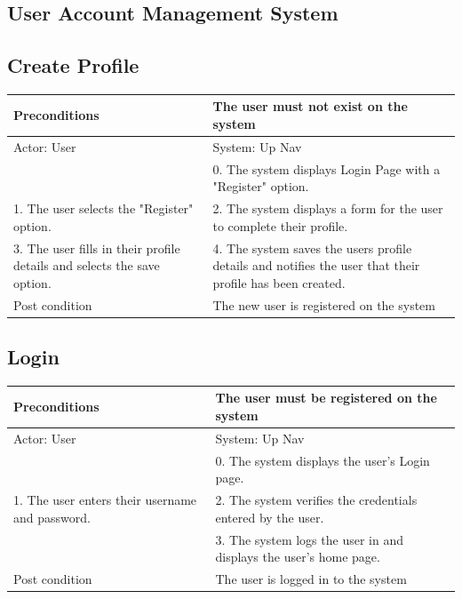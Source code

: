 \documentclass{article}
\begin{document}
\begin{enumerate}
		\section{User Account Management System}

	\subsection{Create Profile}

	\centering

	\begin{tabular}{ | m{15em} | m{15em}| }
		\hline
		Preconditions                                                       				& The user must not exist on the system \\ 				
		\hline
		Actor: User                                                       					& System: Up Nav \\ 			
		\hline
                                                                  							& 0. The system displays Login Page with a "Register" option. \\                                                           
		 \hline
		1. The user selects the "Register" option.					& 2.  The system displays a form for the user to complete their profile. \\				
		\hline
		3. The user fills in their profile details and selects the save option. 		& 4. The system saves the users profile details and notifies the user that their profile has been created. \\ 
		\hline
		Post condition                                                     				& The new user is registered on the system \\ 				
		\hline
	\end{tabular}

	\subsection{Login}
	
	\centering
	\begin{tabular}{ | m{15em} | m{15em}| }
		\hline
		Preconditions                                    												& The user must be registered on the system \\ 
		\hline
		Actor: User                                     												& System: Up Nav \\ 
		\hline
                                               		 													& 0. The system displays the user's Login page. \\ 
		\hline
		1. The user enters their username and password. 										& 2. The system verifies the credentials entered by the user. \\
		\hline
                                                															& 3. The system logs the user in and displays the user's home page. \\
		\hline
		Post condition                                  												& The user is logged in to the system \\ 
		\hline
	\end{tabular}



\end{enumerate}
\end{document}
